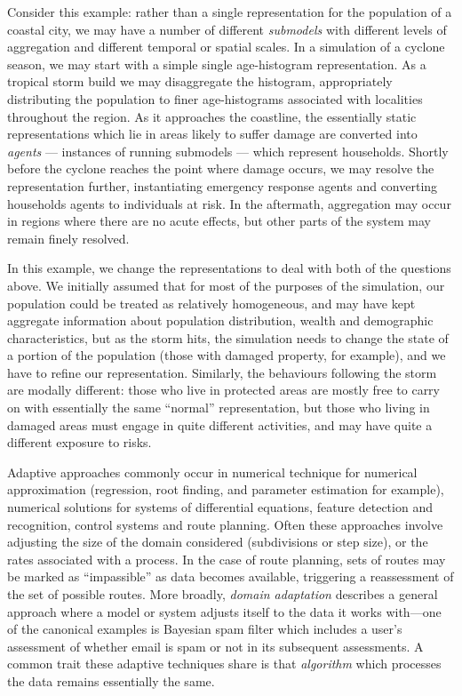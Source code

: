 Consider this example: rather than a single representation for the
population of a coastal city, we may have a number of
different \emph{submodels} with different levels of aggregation and
different temporal or spatial scales.  In a simulation of a cyclone
season, we may start with a simple single age-histogram representation.
As a tropical storm build we may disaggregate the histogram,
appropriately distributing the population to finer age-histograms
associated with localities throughout the region.  As it approaches
the coastline, the essentially static representations which lie in
areas likely to suffer damage are converted into \emph{agents} ---
instances of running submodels --- which represent households.
Shortly before the cyclone reaches the point where damage occurs, we
may resolve the representation further, instantiating emergency
response agents and converting households agents to individuals at
risk.  In the aftermath, aggregation may occur in regions where there
are no acute effects, but other parts of the system may remain finely
resolved.

In this example, we change the representations to deal with both
of the questions above.  We initially assumed that for most of the
purposes of the simulation, our population could be treated as
relatively homogeneous, and may have kept aggregate information about
population distribution, wealth and demographic characteristics, but
as the storm hits, the simulation needs to change the state of
a portion of the population (those with damaged property, for
example), and we have to refine our representation.  Similarly, the
behaviours following the storm are modally different: those who live
in protected areas are mostly free to carry on with essentially the
same ``normal'' representation, but those who living in damaged areas
must engage in quite different activities, and may have quite a
different exposure to risks.

Adaptive approaches commonly occur in numerical technique for
numerical approximation (regression, root finding, and parameter
estimation for example), numerical solutions for systems of
differential equations, feature detection and recognition, control
systems and route planning.  Often these approaches involve adjusting
the size of the domain considered (subdivisions or step size), or the
rates associated with a process. In the case of route planning, sets
of routes may be marked as ``impassible'' as data becomes available,
triggering a reassessment of the set of possible routes. More
broadly, \emph{domain adaptation} describes a general approach where a
model or system adjusts itself to the data it works with---one of the
canonical examples is Bayesian spam filter which includes a user's
assessment of whether email is spam or not in its subsequent
assessments. A common trait these adaptive techniques share is that
\emph{algorithm} which processes the data remains essentially the same.

